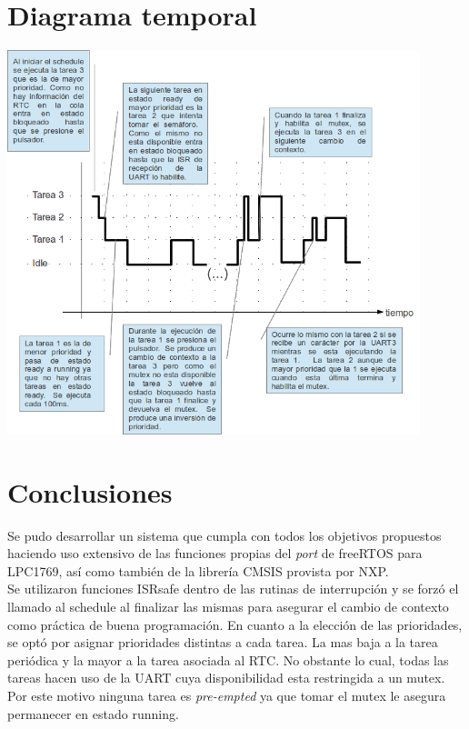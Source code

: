 \documentclass[a4paper,12pt]{article}
\begin{document}
\section{Diagrama temporal}

\includegraphics[width=0.9\textwidth,angle=0]{./imagenes/diagrama-temporal.png}\\

\section{Conclusiones}
Se pudo desarrollar un sistema que cumpla con todos los objetivos propuestos haciendo uso extensivo de las funciones propias del {\textit{port}} de freeRTOS para LPC1769, así como también de la librería CMSIS provista por NXP.\\
Se utilizaron funciones ISRsafe dentro de las rutinas de interrupción y se forzó el llamado al schedule al finalizar las mismas para asegurar el cambio de contexto como práctica de buena programación.
En cuanto a la elección de las prioridades, se optó por asignar prioridades distintas a cada tarea. La mas baja a la tarea periódica y la mayor a la tarea asociada al RTC.  No obstante lo cual, todas las tareas hacen uso de la UART cuya disponibilidad esta restringida a un mutex.  Por este motivo ninguna tarea es {\textit{pre-empted}} ya que tomar el mutex le asegura permanecer en estado running.
\end{document}
